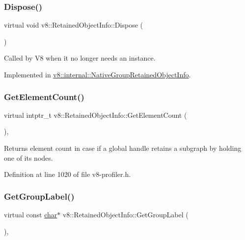 \subsubsection{\texorpdfstring{Dispose()}{Dispose()}}
{\footnotesize\ttfamily virtual void v8\+::\+Retained\+Object\+Info\+::\+Dispose (\begin{DoxyParamCaption}{ }\end{DoxyParamCaption})\hspace{0.3cm}{\ttfamily [pure virtual]}}

Called by V8 when it no longer needs an instance. 

Implemented in \mbox{\hyperlink{classv8_1_1internal_1_1NativeGroupRetainedObjectInfo_a27dc763171801350dc7f7b2b9e74ee42}{v8\+::internal\+::\+Native\+Group\+Retained\+Object\+Info}}.

\mbox{\label{classv8_1_1RetainedObjectInfo_ae6865597469bc7d28bd8ec71b4b890bd}} 
\subsubsection{\texorpdfstring{Get\+Element\+Count()}{GetElementCount()}}
{\footnotesize\ttfamily virtual intptr\+\_\+t v8\+::\+Retained\+Object\+Info\+::\+Get\+Element\+Count (\begin{DoxyParamCaption}{ }\end{DoxyParamCaption})\hspace{0.3cm}{\ttfamily [inline]}, {\ttfamily [virtual]}}

Returns element count in case if a global handle retains a subgraph by holding one of its nodes. 

Definition at line 1020 of file v8-\/profiler.\+h.

\mbox{\label{classv8_1_1RetainedObjectInfo_adf835370c5516f2a89dd2d3f83dee10b}} 
\subsubsection{\texorpdfstring{Get\+Group\+Label()}{GetGroupLabel()}}
{\footnotesize\ttfamily virtual const \mbox{\hyperlink{classchar}{char}}$\ast$ v8\+::\+Retained\+Object\+Info\+::\+Get\+Group\+Label (\begin{DoxyParamCaption}{ }\end{DoxyParamCaption})\hspace{0.3cm}{\ttfamily [inline]}, {\ttfamily [virtual]}}

